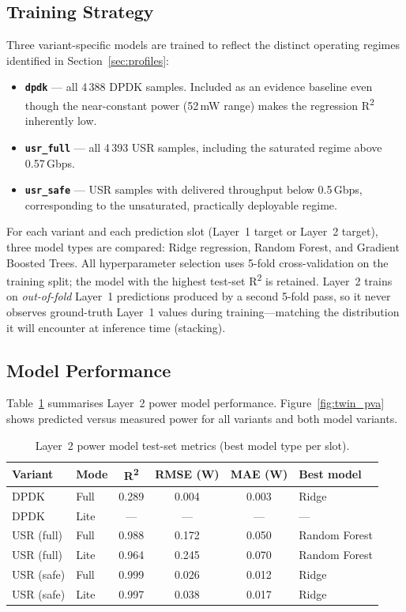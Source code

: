 \documentclass[12pt, a4paper]{report}
\begin{document}
\subsection{Training Strategy}

Three variant-specific models are trained to reflect the distinct operating
regimes identified in Section~\ref{sec:profiles}:

\begin{itemize}
  \item \textbf{\texttt{dpdk}} --- all 4\,388 DPDK samples.
    Included as an evidence baseline even though the near-constant power
    (52\,mW range) makes the regression R\textsuperscript{2} inherently low.
  \item \textbf{\texttt{usr\_full}} --- all 4\,393 USR samples, including the
    saturated regime above 0.57\,Gbps.
  \item \textbf{\texttt{usr\_safe}} --- USR samples with delivered throughput
    below 0.5\,Gbps, corresponding to the unsaturated, practically deployable
    regime.
\end{itemize}

For each variant and each prediction slot (Layer~1 target or Layer~2 target),
three model types are compared: Ridge regression, Random Forest, and Gradient
Boosted Trees.  All hyperparameter selection uses 5-fold cross-validation on
the training split; the model with the highest test-set R\textsuperscript{2}
is retained.  Layer~2 trains on \emph{out-of-fold} Layer~1 predictions
produced by a second 5-fold pass, so it never observes ground-truth Layer~1
values during training---matching the distribution it will encounter at
inference time (stacking).

\subsection{Model Performance}

Table~\ref{tab:twin_r2} summarises Layer~2 power model performance.
Figure~\ref{fig:twin_pva} shows predicted versus measured power for all
variants and both model variants.

\begin{table}[h]
  \centering
  \caption{Layer~2 power model test-set metrics (best model type per slot).}
  \label{tab:twin_r2}
  \begin{tabular}{llcccl}
    \toprule
    Variant & Mode & R\textsuperscript{2} & RMSE (W) & MAE (W) & Best model \\
    \midrule
    DPDK        & Full & 0.289 & 0.004 & 0.003 & Ridge \\
    DPDK        & Lite & ---   & ---   & ---   & --- \\
    USR (full)  & Full & 0.988 & 0.172 & 0.050 & Random Forest \\
    USR (full)  & Lite & 0.964 & 0.245 & 0.070 & Random Forest \\
    USR (safe)  & Full & 0.999 & 0.026 & 0.012 & Ridge \\
    USR (safe)  & Lite & 0.997 & 0.038 & 0.017 & Ridge \\
    \bottomrule
  \end{tabular}
\end{table}
\end{document}
